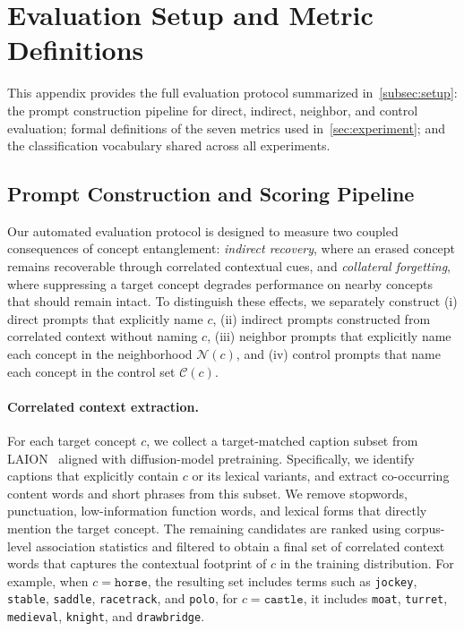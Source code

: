 \section{Evaluation Setup and Metric Definitions}
\label{app:evaluation_setup}
This appendix provides the full evaluation protocol summarized in~\cref{subsec:setup}: the prompt construction pipeline for direct, indirect, neighbor, and control evaluation; formal definitions of the seven metrics used in~\cref{sec:experiment}; and the classification vocabulary shared across all experiments.

\subsection{Prompt Construction and Scoring Pipeline}
\label{app:eval_pipeline}
Our automated evaluation protocol is designed to measure two coupled consequences of concept entanglement: \emph{indirect recovery}, where an erased concept remains recoverable through correlated contextual cues, and \emph{collateral forgetting}, where suppressing a target concept degrades performance on nearby concepts that should remain intact. To distinguish these effects, we separately construct (i) direct prompts that explicitly name $c$, (ii) indirect prompts constructed from correlated context without naming $c$, (iii) neighbor prompts that explicitly name each concept in the neighborhood $\mathcal{N}(c)$, and (iv) control prompts that name each concept in the control set $\mathcal{C}(c)$.

\paragraph{Correlated context extraction.}
For each target concept $c$, we collect a target-matched caption subset from LAION~\citep{schuhmann2022laion} aligned with diffusion-model pretraining. Specifically, we identify captions that explicitly contain $c$ or its lexical variants, and extract co-occurring content words and short phrases from this subset. We remove stopwords, punctuation, low-information function words, and lexical forms that directly mention the target concept. The remaining candidates are ranked using corpus-level association statistics and filtered to obtain a final set of correlated context words that captures the contextual footprint of $c$ in the training distribution. For example, when $c=\texttt{horse}$, the resulting set includes terms such as \texttt{jockey}, \texttt{stable}, \texttt{saddle}, \texttt{racetrack}, and \texttt{polo}, for $c = \texttt{castle}$, it includes \texttt{moat}, \texttt{turret}, \texttt{medieval}, \texttt{knight}, and \texttt{drawbridge}.

